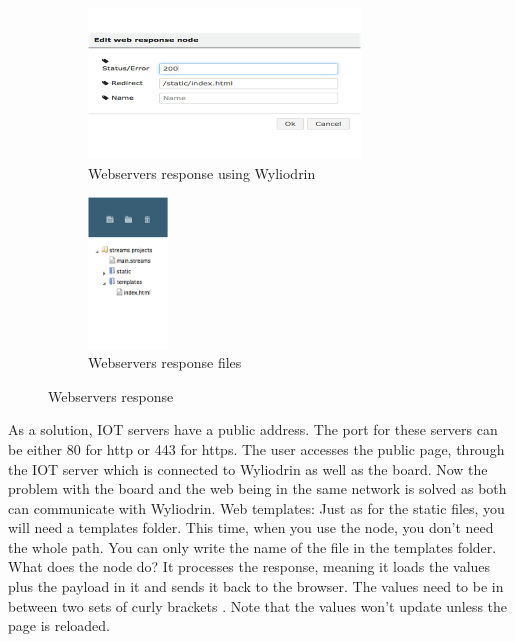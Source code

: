 \begin{figure}[ht]

\begin{subfigure}{0.5\textwidth}
    \includegraphics[width=0.9\linewidth, height=4cm]{figures/Webservers response using Wyliodrin.png}
    \caption{Webservers response using Wyliodrin}
\end{subfigure}
\begin{subfigure}{0.4\textwidth}
    \includegraphics[width=0.9\linewidth, height=4cm]{figures/Webservers response files.png}
    \caption{Webservers response files}
\end{subfigure}

\caption{Webservers response}
\end{figure}

As a solution, IOT servers have a public address. The port for these servers can be either 80 for http or 443 for https. The user accesses the public page, through the IOT server which is connected to Wyliodrin as well as the board. Now the problem with the board and the web being in the same network is solved as both can communicate with Wyliodrin.  
Web templates: Just as for the static files, you will need a templates folder. This time, when you use the node, you don't need the whole path. You can only write the name of the file in the templates folder. What does the node do? It processes the response, meaning it loads the values plus the payload in it and sends it back to the browser. The values need to be in between two sets of curly brackets {{}}. Note that the values won't update unless the page is reloaded.  

